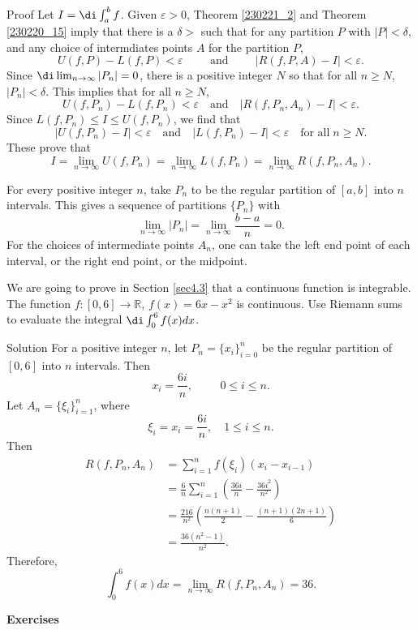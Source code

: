 \begin{myproof}{Proof}
Let $I=\di\int_a^bf$. Given $\varepsilon>0$, Theorem \ref{230221_2} and Theorem \ref{230220_15} imply that there is a $\delta>$ such that for any partition $P$ with $|P|<\delta$, and any choice of intermdiates points $A$ for the partition $P$,  
\[U(f,P)-L(f,P)<\varepsilon \hspace{1cm}\text{and}\hspace{1cm}|R(f, P, A)-I|<\varepsilon.\]\bp
Since $\di\lim_{n\to \infty}|P_n|=0$, there is a positive integer $N$ so that for all $n\geq N$, $|P_n|<\delta$. This implies that
for all $n\geq N$, 
\[U(f,P_n)-L(f,P_n)<\varepsilon \quad\text{and}\quad|R(f, P_n, A_n)-I|<\varepsilon.\]
Since $L(f,P_n)\leq I\leq U(f,P_n)$,
we find that
\[|U(f,P_n)-I|<\varepsilon\quad\text{and}\quad|L(f,P_n)-I|<\varepsilon \quad\text{for all}\;n\geq N.\]
These prove that
\[I=\lim_{n\to \infty}U(f,P_n) =\lim_{n\to \infty}L(f,P_n)=\lim_{n\to \infty}R(f,P_n, A_n).\]
\end{myproof}
\begin{highlight}{}For every positive integer $n$, take $P_n$ to be the regular partition of $[a,b]$ into $n$ intervals.  This gives a sequence of partitions $\{P_n\}$ with \[\lim_{n\to \infty}|P_n|=\lim_{n\to\infty}\frac{b-a}{n}=0.\] For the choices of intermediate points $A_n$, one can take the left end point of each interval, or the right end point, or the midpoint. \end{highlight}
\begin{example}{}
We are going to prove in Section \ref{sec4.3} that a continuous function is integrable. The function $f:[0, 6]\to\mathbb{R}$, $f(x)=6x-x^2 $ is continuous. Use Riemann sums to evaluate the integral $\di \int_0^6f(x)dx$.
\end{example}
\begin{solution}{Solution}
For a positive integer $n$, let $P_n=\{x_i\}_{i=0}^n$ be the regular partition of $[0,6]$ into $n$ intervals. Then
\[x_i=\frac{6i}{n},\hspace{1cm} 0\leq i\leq n.\]\bs
Let $A_n=\{\xi_i\}_{i=1}^n$, where
\[\xi_i=x_i=\frac{6i}{n}, \quad 1\leq i\leq n.\]  Then
\begin{align*}
R(f,P_n,A_n)&=\sum_{i=1}^nf(\xi_i)(x_i-x_{i-1})\\&=\frac{6}{n}\sum_{i=1}^n\left(\frac{36i}{n}-\frac{36i^2}{n^2}\right)\\
&=\frac{216}{n^2}\left(\frac{n (n+1)}{2}-\frac{ (n+1)(2n+1)}{6}\right)\\
&=\frac{36(n^2-1)}{n^2}.
\end{align*}
Therefore,
\[\int_0^6f(x)dx=\lim_{n\to\infty}R(f,P_n,A_n)=36.\]
\end{solution}
\vp
\noindent
{\bf \large Exercises  \thesection}
\setcounter{myquestion}{1}


